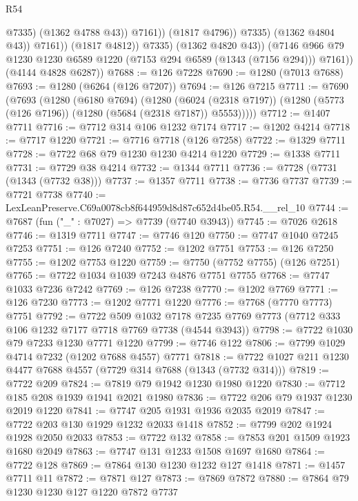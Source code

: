 \begin{lexlean}{R54}
\begin{coremodule}
                                @7335)
                              (@1362 @4788 @43))
                            @7161))
                        (@1817 @4796))
                      @7335)
                    (@1362 @4804 @43))
                  @7161))
              (@1817 @4812))
            @7335)
          (@1362 @4820 @43))
        (@7146 @966 @79 @1230 @1230 @6589 @1220 (@7153 @294 @6589 (@1343 (@7156 @294))) @7161))
      (@4144 @4828 @6287))
@7688 := @126 @7228
@7690 := @1280 (@7013 @7688)
@7693 := @1280 (@6264 (@126 @7207))
@7694 := @126 @7215
@7711 := @7690
    (@7693
      (@1280
        (@6180 @7694)
        (@1280
          (@6024 (@2318 @7197))
          (@1280 (@5773 (@126 @7196)) (@1280 (@5684 (@2318 @7187)) @5553)))))
@7712 := @1407 @7711
@7716 := @7712 @314 @106 @1232 @7174
@7717 := @1202 @4214
@7718 := @7717 @1220
@7721 := @7716 @7718 (@126 @7258)
@7722 := @1329 @7711
@7728 := @7722 @68 @79 @1230 @1230 @4214 @1220
@7729 := @1338 @7711
@7731 := @7729 @38 @4214
@7732 := @1344 @7711
@7736 := @7728 (@7731 (@1343 (@7732 @38)))
@7737 := @1357 @7711
@7738 := @7736 @7737
@7739 := @7721 @7738
@7740 := LexLeanPreserve.C69a0078cb8f644959d8d87c652d4be05.R54.__rel_10
@7744 := @7687 (fun ("_" : @7027) => @7739 (@7740 @3943))
@7745 := @7026 @2618
@7746 := @1319 @7711
@7747 := @7746 @120
@7750 := @7747 @1040 @7245 @7253
@7751 := @126 @7240
@7752 := @1202 @7751
@7753 := @126 @7250
@7755 := @1202 @7753 @1220
@7759 := @7750 (@7752 @7755) (@126 @7251)
@7765 := @7722 @1034 @1039 @7243 @4876 @7751 @7755
@7768 := @7747 @1033 @7236 @7242
@7769 := @126 @7238
@7770 := @1202 @7769
@7771 := @126 @7230
@7773 := @1202 @7771 @1220
@7776 := @7768 (@7770 @7773) @7751
@7792 := @7722
    @509
    @1032
    @7178
    @7235
    @7769
    @7773
    (@7712 @333 @106 @1232 @7177 @7718 @7769 @7738 (@4544 @3943))
@7798 := @7722 @1030 @79 @7233 @1230 @7771 @1220
@7799 := @7746 @122
@7806 := @7799 @1029 @4714 @7232 (@1202 @7688 @4557) @7771
@7818 := @7722 @1027 @211 @1230 @4477 @7688 @4557 (@7729 @314 @7688 (@1343 (@7732 @314)))
@7819 := @7722 @209
@7824 := @7819 @79 @1942 @1230 @1980 @1220
@7830 := @7712 @185 @208 @1939 @1941 @2021 @1980
@7836 := @7722 @206 @79 @1937 @1230 @2019 @1220
@7841 := @7747 @205 @1931 @1936 @2035 @2019
@7847 := @7722 @203 @130 @1929 @1232 @2033 @1418
@7852 := @7799 @202 @1924 @1928 @2050 @2033
@7853 := @7722 @132
@7858 := @7853 @201 @1509 @1923 @1680 @2049
@7863 := @7747 @131 @1233 @1508 @1697 @1680
@7864 := @7722 @128
@7869 := @7864 @130 @1230 @1232 @127 @1418
@7871 := @1457 @7711 @11
@7872 := @7871 @127
@7873 := @7869 @7872
@7880 := @7864 @79 @1230 @1230 @127 @1220 @7872 @7737

\end{coremodule}
\end{lexlean}
